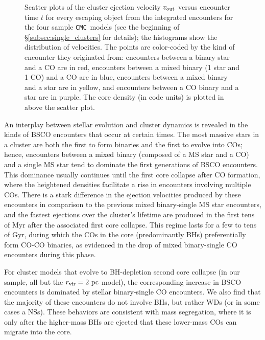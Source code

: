 \documentclass[twocolumn,linenumbers]{aastex631}
\newcommand{\CMC}{\texttt{CMC}}
\begin{document}
\begin{figure*}
    \caption{
        Scatter plots of the cluster ejection velocity $v_{\rm out}$ versus encounter time $t$ for every escaping object from the integrated encounters for the four sample \CMC\ models (see the beginning of \S\ref{subsec:single_clusters} for details); the histograms show the distribution of velocities.
        The points are color-coded by the kind of encounter they originated from: encounters between a binary star and a CO are in red, encounters between a mixed binary (1 star and 1 CO) and a CO are in blue, encounters between a mixed binary and a star are in yellow, and encounters between a CO binary and a star are in purple.
        The core density (in code units) is plotted in above the scatter plot.
    }
    \label{fig:cmc_single_clusters}
\end{figure*}

An interplay between stellar evolution and cluster dynamics is revealed in the kinds of BSCO encounters that occur at certain times.
The most massive stars in a cluster are both the first to form binaries and the first to evolve into COs; hence, encounters between a mixed binary (composed of a MS star and a CO) and a single MS star tend to dominate the first generations of BSCO encounters.
This dominance usually continues until the first core collapse after CO formation, where the heightened densities facilitate a rise in encounters involving multiple COs.
There is a stark difference in the ejection velocities produced by these encounters in comparison to the previous mixed binary-single MS star encounters, and the fastest ejections over the cluster's lifetime are produced in the first tens of Myr after the associated first core collapse.
This regime lasts for a few to tens of Gyr, during which the COs in the core (predominantly BHs) preferentially form CO-CO binaries, as evidenced in the drop of mixed binary-single CO encounters during this phase.

For cluster models that evolve to BH-depletion second core collapse (in our sample, all but the $r_{\rm vir} = 2~{\rm pc}$ model), the corresponding increase in BSCO encounters is dominated by stellar binary-single CO encounters.
We also find that the majority of these encounters do not involve BHs, but rather WDs (or in some cases a NSs).
These behaviors are consistent with mass segregation, where it is only after the higher-mass BHs are ejected that these lower-mass COs can migrate into the core.
\end{document}
